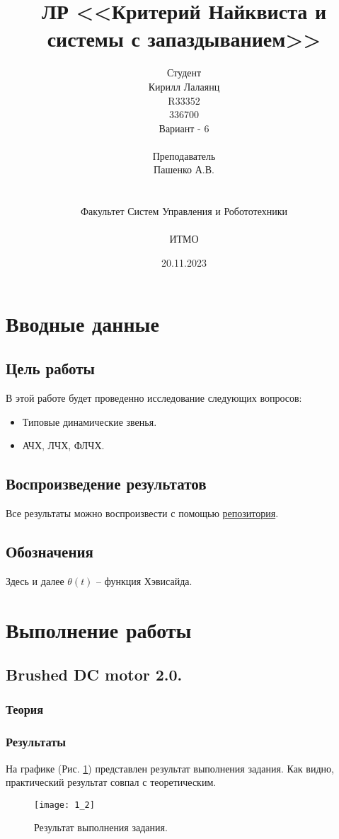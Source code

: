 \documentclass[16pt]{article}
\title{ЛР \textnumero 6 <<Критерий Найквиста и системы с запаздыванием>>}
\author{
Студент \\
Кирилл Лалаянц\\
R33352\\
336700\\
Вариант - 6\\
\\
Преподаватель\\
Пашенко А.В. \\
\\
\\
Факультет Систем Управления и Робототехники\\
\\
ИТМО\\
}
\date{20.11.2023}
\begin{document}
\maketitle
\newpage
\tableofcontents
\thispagestyle{empty}

\newpage
\setcounter{page}{1}

\section{Вводные данные}
\subsection{Цель работы}
В этой работе будет проведенно исследование следующих вопросов:
\begin{itemize}
    \item Типовые динамические звенья.
    \item АЧХ, ЛЧХ, ФЛЧХ.
\end{itemize} 

\subsection{Воспроизведение результатов}
Все результаты можно воспроизвести с помощью \href{https://github.com/lalayants/control-theory-itmo-2023}{репозитория}.

\subsection{Обозначения}
Здесь и далее \(\theta(t)\) -- функция Хэвисайда.

\newpage
\section{Выполнение работы}
\label{sec:headings}


\subsection{Brushed DC motor 2.0.}

\subsubsection{Теория}
\subsubsection{Результаты}
На графике (Рис. \ref*{fig:fig1}) представлен результат выполнения задания. Как видно, практический результат совпал с теоретическим.
\begin{figure}[h!]
    \centering
    \texttt{[image: 1\_2]}
    \caption{Результат выполнения задания.}
    \label{fig:fig1}
\end{figure}
\end{document}
